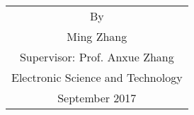 \begin{titlepage}
\begin{center}
		\vspace{4cm}
		{\sanhao
			\begin{center} \renewcommand{\arraystretch}{1.5}
				\begin{tabular}{c}
					By \\
					Ming Zhang \\
					Supervisor: Prof. Anxue Zhang \\
					Electronic Science and Technology \\
					September 2017 \\
				\end{tabular} \renewcommand{\arraystretch}{1}
			\end{center} 
		}
	\end{center}
	\clearpage{\pagestyle{empty}\cleardoublepage}
\end{titlepage}
